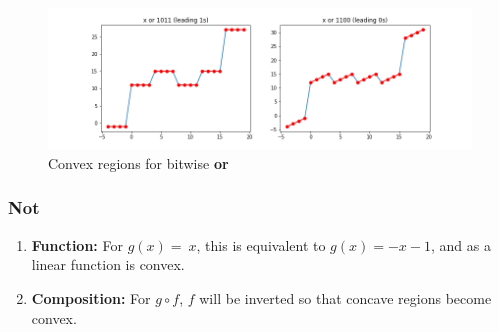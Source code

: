 \documentclass[11pt]{article}
\theoremstyle{definition}
\begin{document}
\begin{figure}[h!]
  \centering
  \includegraphics[width=\linewidth]{figs/or.png}
  \caption{Convex regions for bitwise \textbf{or}}
\end{figure}


\subsubsection*{Not}
\begin{enumerate}
\item \textbf{Function:} For $g(x) = ~x$, this is equivalent to $g(x) = -x - 1$, and as a linear function is convex. 
\item \textbf{Composition:} For $g \circ f$, $f$ will be inverted so that concave regions become convex. 
\end{enumerate}

\end{document}
